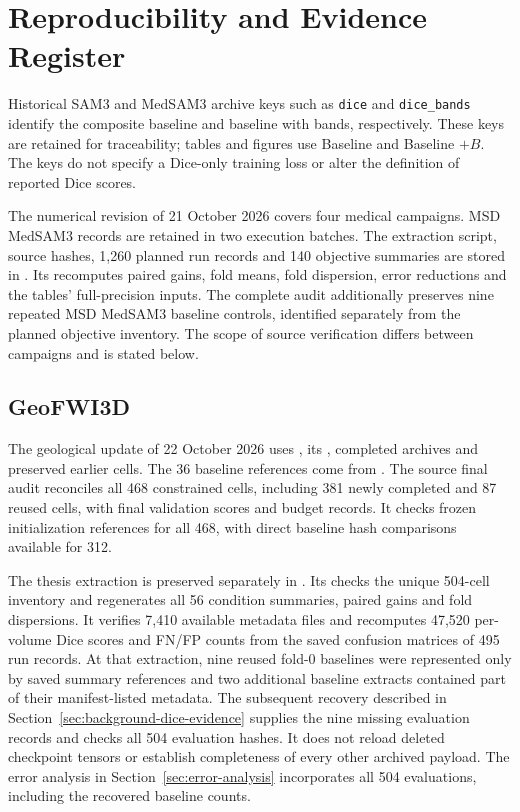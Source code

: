 \documentclass[12pt,a4paper]{article}
\begin{document}
\section{Reproducibility and Evidence Register}
\label{sec:evidence-register}

Historical SAM3 and MedSAM3 archive keys such as \texttt{dice} and
\texttt{dice\_bands} identify the composite baseline and baseline with
bands, respectively. These keys are retained for traceability; tables
and figures use Baseline and Baseline $+B$. The keys do not specify a
Dice-only training loss or alter the definition of reported Dice scores.

The numerical revision of 21 October 2026 covers four medical
campaigns. MSD MedSAM3 records are retained in two execution batches. The extraction script, source hashes,
1,260 planned run records and 140 objective summaries are stored in
. Its
 recomputes paired gains, fold means, fold dispersion,
error reductions and the tables' full-precision inputs. The complete
audit additionally preserves nine repeated MSD MedSAM3 baseline
controls, identified separately from the planned objective inventory.
The scope of
source verification differs between campaigns and is stated below.

\subsection{GeoFWI3D}

The geological update of 22 October 2026 uses
, its
, completed archives and preserved earlier
cells. The 36 baseline references come from
.
The source final audit reconciles all 468 constrained cells, including
381 newly completed and 87 reused cells, with final validation scores
and budget records. It checks frozen initialization references for
all 468, with direct baseline hash comparisons available for 312.

The thesis extraction is preserved separately in
. Its 
checks the unique 504-cell inventory and regenerates all 56 condition
summaries, paired gains and fold dispersions. It verifies 7,410
available metadata files and recomputes 47,520 per-volume Dice scores
and FN/FP counts from the saved confusion matrices of 495 run records.
At that extraction, nine reused fold-0 baselines were represented
only by saved summary references and two additional baseline extracts
contained part of their manifest-listed metadata. The subsequent
recovery described in Section~\ref{sec:background-dice-evidence}
supplies the nine missing evaluation records and checks all 504
evaluation hashes. It does not reload deleted checkpoint tensors
or establish completeness of every other archived payload. The
error analysis in Section~\ref{sec:error-analysis} incorporates
all 504 evaluations, including the recovered baseline counts.
\end{document}
